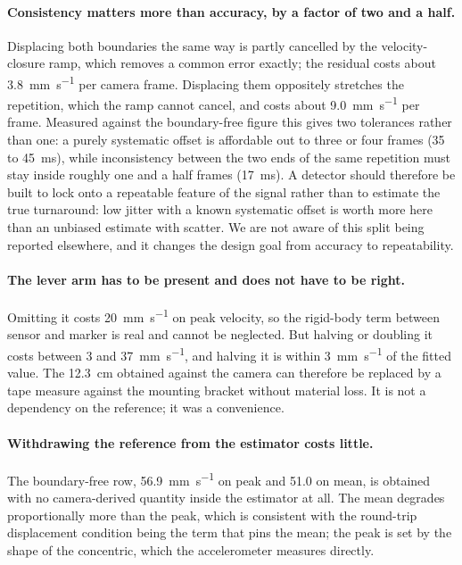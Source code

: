 \paragraph{Consistency matters more than accuracy, by a factor of two and a half.}
Displacing both boundaries the same way is partly cancelled by the velocity-closure ramp,
which removes a common error exactly; the residual costs about
\SI{3.8}{\milli\metre\per\second} per camera frame. Displacing them oppositely stretches
the repetition, which the ramp cannot cancel, and costs about
\SI{9.0}{\milli\metre\per\second} per frame. Measured against the boundary-free figure
this gives two tolerances rather than one: a purely systematic offset is affordable out to
three or four frames (\SI{35}{} to \SI{45}{\milli\second}), while inconsistency between
the two ends of the same repetition must stay inside roughly one and a half frames
(\SI{17}{\milli\second}). A detector should therefore be built to lock onto a repeatable
feature of the signal rather than to estimate the true turnaround: low jitter with a known
systematic offset is worth more here than an unbiased estimate with scatter. We are not
aware of this split being reported elsewhere, and it changes the design goal from accuracy
to repeatability.

\paragraph{The lever arm has to be present and does not have to be right.} Omitting it
costs \SI{20}{\milli\metre\per\second} on peak velocity, so the rigid-body term between
sensor and marker is real and cannot be neglected. But halving or doubling it costs
between \num{3} and \SI{37}{\milli\metre\per\second}, and halving it is within
\SI{3}{\milli\metre\per\second} of the fitted value. The
\SI{12.3}{\centi\metre} obtained against the camera can therefore be replaced by a tape
measure against the mounting bracket without material loss. It is not a dependency on the
reference; it was a convenience.

\paragraph{Withdrawing the reference from the estimator costs little.} The
boundary-free row, \SI{56.9}{\milli\metre\per\second} on peak and
\num{51.0} on mean, is obtained with no camera-derived quantity inside the estimator at
all. The mean degrades proportionally more than the peak, which is consistent with the
round-trip displacement condition being the term that pins the mean; the peak is set by the
shape of the concentric, which the accelerometer measures directly.

